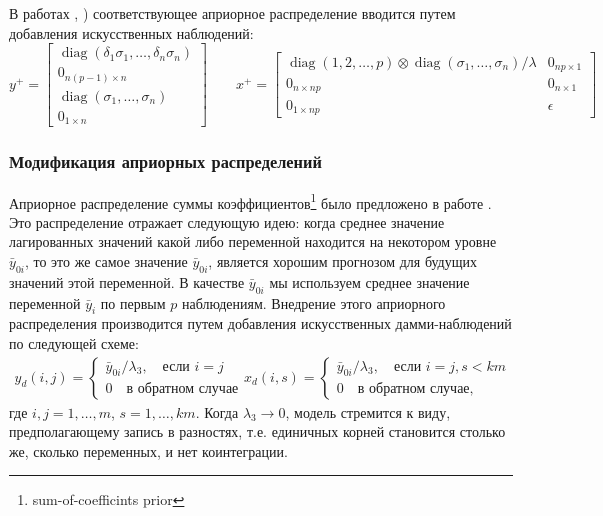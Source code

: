 \documentclass[11pt]{article} %
\DeclareMathOperator{\diag}{diag}
\begin{document}
В работах  \cite{banbura_al_2010_large}, \cite{berg_henzel_2013_point}) соответствующее априорное распределение вводится путем добавления искусственных наблюдений:
\begin{equation}
y^{+}=\begin{bmatrix}
\diag(\delta_1\sigma_1,\ldots, \delta_n\sigma_n)\\
0_{n(p-1)\times n}\\
\diag(\sigma_1,\ldots,\sigma_n)\\
0_{1\times n}
\end{bmatrix}
\qquad
%
x^{+}=\begin{bmatrix}
\diag(1,2,\ldots, p)\otimes \diag(\sigma_1,\ldots,\sigma_n)/\lambda & 0_{np\times 1} \\
0_{n\times np}&0_{n\times 1}\\
0_{1\times np}&\epsilon
\end{bmatrix}
\end{equation}


\subsubsection*{Модификация априорных распределений}

Априорное распределение суммы коэффициентов\footnote{sum-of-coefficints prior} было предложено в работе  \cite{doan_litterman_sims_1984_forecasting}. Это распределение отражает следующую идею:
когда среднее значение лагированных значений какой либо переменной находится на некотором уровне $\bar y_{0i}$, то это же самое значение  $\bar y_{0i}$, является хорошим прогнозом  для будущих значений этой переменной. В качестве  $\bar y_{0i}$ мы используем среднее значение переменной  $\bar y_{i}$ по первым  $p$ наблюдениям. Внедрение этого априорного распределения производится путем добавления искусственных дамми-наблюдений по следующей схеме:
\begin{gather*}
y_d(i,j)=\begin{cases}
\bar y_{0i}/\lambda_3, \quad \text{если }i=j\\
0 \quad \text{в обратном случае}
\end{cases}
x_d(i,s)=\begin{cases}
\bar y_{0i}/\lambda_3,\quad \text{если }i=j, s<km\\
0 \quad \text{в обратном случае,}
\end{cases}
\end{gather*}
где $i,j=1,\ldots,m$, $s=1, \ldots, km$. Когда $\lambda_3\to 0$, модель стремится к виду, предполагающему запись в разностях, т.е. единичных корней становится столько же, сколько переменных, и нет коинтеграции.
\end{document}
